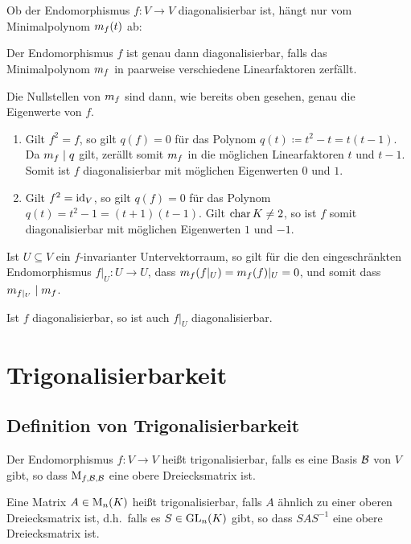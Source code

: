 Ob der Endomorphismus $f \colon V \to V$ diagonalisierbar ist, hängt nur vom Minimalpolynom $m_{f}(t)$ ab:

\begin{proposition}
  Der Endomorphismus $f$ ist genau dann diagonalisierbar, falls das Minimalpolynom $m_{f}$ in paarweise verschiedene Linearfaktoren zerfällt.
\end{proposition}

Die Nullstellen von $m_{f}$ sind dann, wie bereits oben gesehen, genau die Eigenwerte von $f$.

\begin{example}
  \begin{enumerate}
    \item
      Gilt $f^2 = f$, so gilt $q(f) = 0$ für das Polynom $q(t) \coloneqq t^2 - t = t(t-1)$.
      Da $m_{f} \mid q$ gilt, zerällt somit $m_{f}$ in die möglichen Linearfaktoren $t$ und $t-1$.
      Somit ist $f$ diagonalisierbar mit möglichen Eigenwerten $0$ und $1$.
    \item
      Gilt $f^2 = \operatorname{id}_V$, so gilt $q(f) = 0$ für das Polynom $q(t) = t^2 - 1 = (t+1)(t-1)$.
      Gilt $\operatorname{char} K \neq 2$, so ist $f$ somit diagonalisierbar mit möglichen Eigenwerten $1$ und $-1$.
  \end{enumerate}
\end{example}

Ist $U \subseteq V$ ein $f$-invarianter Untervektorraum, so gilt für die den eingeschränkten Endomorphismus $f|_U \colon U \to U$, dass $m_{f}(f|_U) = m_{f}(f)|_U = 0$, und somit dass $m_{f|_U} \mid m_{f}$.

\begin{corollary}
  Ist $f$ diagonalisierbar, so ist auch $f|_U$ diagonalisierbar.
\end{corollary}





\section{Trigonalisierbarkeit}



\subsection{Definition von Trigonalisierbarkeit}

\begin{definition}
  Der Endomorphismus $f \colon V \to V$ heißt trigonalisierbar, falls es eine Basis $\mathcal{B}$ von $V$ gibt, so dass $\operatorname{M}_{f, \mathcal{B}, \mathcal{B}}$ eine obere Dreiecksmatrix ist.
  
  Eine Matrix $A \in \operatorname{M}_{n}(K)$ heißt trigonalisierbar, falls $A$ ähnlich zu einer oberen Dreiecksmatrix ist, d.h.\ falls es $S \in \operatorname{GL}_{n}(K)$ gibt, so dass $S A S^{-1}$ eine obere Dreiecksmatrix ist.
\end{definition}

